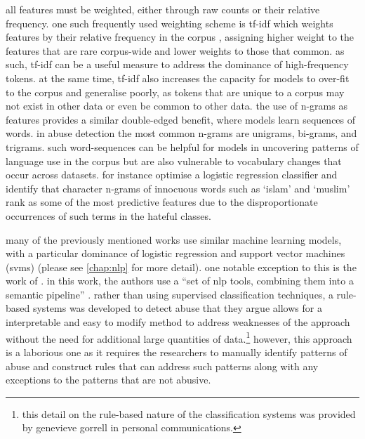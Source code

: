 all features must be weighted, either through raw counts or their relative frequency.
one such frequently used weighting scheme is tf-idf which weights features by their relative frequency in the corpus \citep{fortuna:2018}, assigning higher weight to the features that are rare corpus-wide and lower weights to those that common.
as such, tf-idf can be a useful measure to address the dominance of high-frequency tokens.
at the same time, tf-idf also increases the capacity for models to over-fit to the corpus and generalise poorly, as tokens that are unique to a corpus may not exist in other data or even be common to other data.
the use of n-grams as features provides a similar double-edged benefit, where models learn sequences of words.
in abuse detection the most common n-grams are unigrams, bi-grams, and trigrams.
such word-sequences can be helpful for models in uncovering patterns of language use in the corpus but are also vulnerable to vocabulary changes that occur across datasets.
for instance \citet{waseem-hovy:2016} optimise a logistic regression classifier and identify that character n-grams of innocuous words such as `islam' and `muslim' rank as some of the most predictive features due to the disproportionate occurrences of such terms in the hateful classes.

many of the previously mentioned works use similar machine learning models, with a particular dominance of logistic regression and support vector machines (svms) (please see \cref{chap:nlp} for more detail).
one notable exception to this is the work of \citet{gorrell:2018}.
in this work, the authors use a ``set of nlp tools, combining them into a semantic pipeline'' \citep[pp. 601]{gorrell:2018}.
rather than using supervised classification techniques, a rule-based systems was developed to detect abuse that they argue allows for a interpretable and easy to modify method to address weaknesses of the approach without the need for additional large quantities of data.\footnote{this detail on the rule-based nature of the classification systems was provided by genevieve gorrell in personal communications.}
however, this approach is a laborious one as it requires the researchers to manually identify patterns of abuse and construct rules that can address such patterns along with any exceptions to the patterns that are not abusive.

